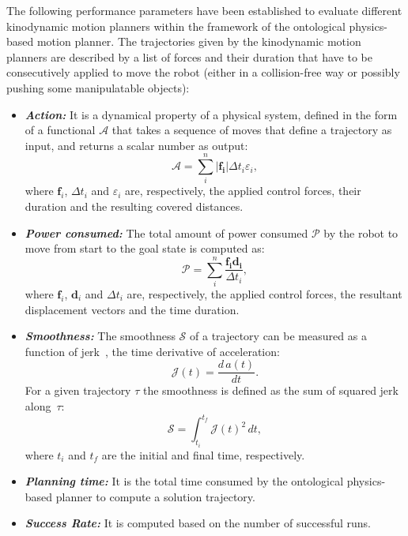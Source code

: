 \documentclass[runningheads,a4paper]{llncs}
\begin{document}
The following performance parameters have been established to evaluate different kinodynamic motion planners within the framework of the ontological physics-based motion planner.
The trajectories given by the kinodynamic motion planners are described by a list of forces and their duration that have to be consecutively applied to move the robot (either in a collision-free way or possibly pushing some manipulatable objects):
\begin{itemize}
 \item \textbf{\textit{Action:}}
 It is a dynamical property of a physical system, defined in the form of a functional $\mathcal{A}$
 that takes a sequence of moves that define a trajectory as input, and returns a scalar number as  output:
 \begin{equation}
\label{eq:action}
  \mathcal{A}  =\sum\limits_{i}^n|\mathbf{f_i}| \Delta t_i \varepsilon_i,
\end{equation}
where $\mathbf{f}_i$, $\Delta t_i$ and $\varepsilon_i$ are, respectively, the applied control forces, their duration and the resulting covered distances.
 \item \textbf{\textit{Power consumed:}}
 The total amount of power consumed $\mathcal{P}$ by the robot to move from start to the goal state is computed as:
 \begin{equation}
\label{eq:power}
  \mathcal{P}  =  \sum\limits_{i}^n\frac{\mathbf{f_i} \mathbf{d_i}}{\Delta t_i},
\end{equation}
where $\mathbf{f}_i$, $\mathbf{d}_i$ and $\Delta t_i$ are, respectively, the applied control forces, the resultant displacement vectors and the time duration.
 \item \textbf{\textit{Smoothness:}} The smoothness $\mathcal{S}$ of a trajectory can be measured as a function of jerk~\cite{hogan1984}, the time derivative of
 acceleration:
  \begin{equation}
\label{eq:jerk}
\mathcal{J}(t) =   \frac{d\,a(t)}{dt}.
\end{equation}
 For a given trajectory $\tau$ the smoothness is defined as the sum of squared jerk along~$\tau$:
 \begin{equation}
\label{eq:smoothness}
\mathcal{S} =   \int_{t_i}^{t_f} \mathcal{J}(t)^2\,dt,
\end{equation}
where $t_i$ and $t_f$ are the initial and final time, respectively.
 \item \textbf{\textit{Planning time:}}
 It is the total time consumed by the ontological physics-based planner to compute a solution trajectory.
 \item \textbf{\textit{Success Rate:}}
It is computed based on the number of successful runs.
\end{itemize}
\end{document}
